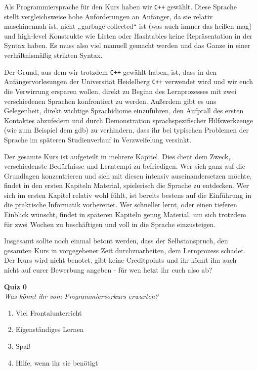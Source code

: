 \documentclass{vorkurs}
\newcommand{\swname}[1]{\texttt{#1}\xspace}
\newcommand{\Cpp}{\swname{C++}}
\begin{document}
Als Programmiersprache für den Kurs haben wir \Cpp gewählt.  Diese Sprache stellt
vergleichsweise hohe Anforderungen an Anfänger, da sie relativ maschinennah
ist, nicht „garbage-collected“ ist (was auch immer das heißen mag) und
high-level Konstrukte wie Listen oder Hashtables keine Repräsentation in der
Syntax haben.  Es muss also viel manuell gemacht werden und das Ganze in einer
verhältnismäßig strikten Syntax.

Der Grund, aus dem wir trotzdem \Cpp gewählt haben, ist, dass in den
Anfängervorlesungen der Universität Heidelberg \Cpp verwendet wird und wir euch
die Verwirrung ersparen wollen, direkt zu Beginn des Lernprozesses mit zwei
verschiedenen Sprachen konfrontiert zu werden.  Außerdem gibt es uns
Gelegenheit, direkt wichtige Sprachidiome einzuführen, den Aufprall des ersten
Kontaktes abzufedern und durch Demonstration sprachspezifischer Hilfswerkzeuge
(wie zum Beispiel dem gdb) zu verhindern, dass ihr bei typischen Problemen der
Sprache im späteren Studienverlauf in Verzweifelung versinkt.

Der gesamte Kurs ist aufgeteilt in mehrere Kapitel. Dies dient dem Zweck,
verschiedenste Bedürfnisse und Lerntempi zu befriedigen.  Wer sich ganz auf die
Grundlagen konzentrieren und sich mit diesen intensiv auseinandersetzen möchte,
findet in den ersten Kapiteln Material, spielerisch die Sprache zu entdecken.
Wer sich im ersten Kapitel relativ wohl fühlt, ist bereits bestens auf die
Einführung in die praktische Informatik vorbereitet.  Wer schneller lernt, oder
einen tieferen Einblick wünscht, findet in späteren Kapiteln genug Material, um
sich trotzdem für zwei Wochen zu beschäftigen und voll in die Sprache
einzusteigen.

Insgesamt sollte noch einmal betont werden, dass der Selbstanspruch, den
gesamten Kurs in vorgegebener Zeit durchzuarbeiten, dem Lernprozess schadet.
Der Kurs wird nicht benotet, gibt keine Creditpoints und ihr könnt ihn auch
nicht auf eurer Bewerbung angeben - für wen hetzt ihr euch also ab?

\newpage

\textbf{Quiz 0}\\
\textit{Was könnt ihr vom Programmiervorkurs erwarten?}
\begin{enumerate}[label=\alph*)]
    \item Viel Frontalunterricht
    \item Eigenständiges Lernen
    \item Spaß
    \item Hilfe, wenn ihr sie benötigt
\end{enumerate}

\tableofcontents




\end{document}
